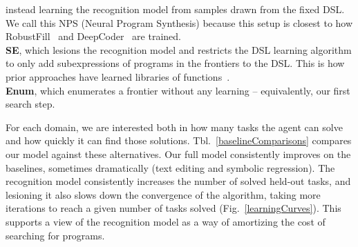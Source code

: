 \documentclass{article}
\begin{document}
instead learning the recognition model
from samples drawn from the fixed DSL.
We call this NPS (Neural Program Synthesis)
because this setup is closest to how
RobustFill~\cite{devlin2017robustfill} and DeepCoder~\cite{balog2016deepcoder} are trained.
\\\noindent \textbf{SE}, which lesions the recognition model and restricts the DSL  learning algorithm to
only add subexpressions of programs in the frontiers to the DSL. This is how prior approaches have learned libraries of functions~\cite{Dechter:2013:BLV:2540128.2540316,DBLP:conf/icml/LiangJK10,DBLP:conf/ecai/LinDETM14}.
\\\noindent \textbf{Enum}, which enumerates a frontier without any learning -- equivalently, our first search step.

For each domain,
we are interested both in how many tasks the
agent can solve and how quickly it can find those solutions.
Tbl.~\ref{baselineComparisons}
compares our model against these alternatives.
Our full model consistently
improves on the baselines,
sometimes dramatically (text editing and symbolic regression).
The recognition model 
consistently increases the number of solved held-out tasks,
and lesioning it also slows down the convergence of the algorithm,
taking more iterations to reach a given number of tasks solved (Fig.~\ref{learningCurves}).
This supports a view of the recognition model as a way of amortizing the cost of searching for programs.
\end{document}
